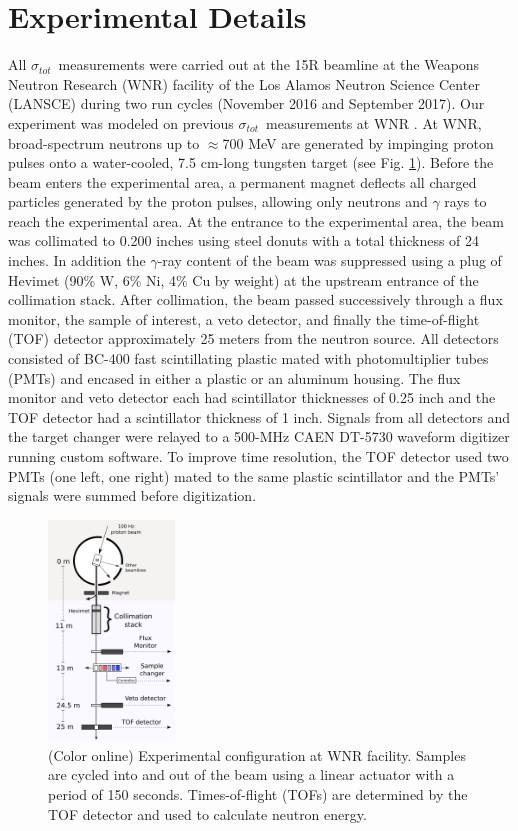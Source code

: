 \documentclass[twocolumn,secnumarabic,amssymb, nobibnotes, aps, prl,
superscriptaddress, nobalancelastpage]{revtex4}
\newcommand{\tot}{\ensuremath{\sigma_{tot}}}
\begin{document}
\section{Experimental Details}
All \tot\ measurements were carried out at the 15R
beamline at the Weapons Neutron Research (WNR) facility of the Los Alamos
Neutron Science Center (LANSCE) during two run cycles (November 2016 and
September 2017). Our experiment was modeled on previous
\tot\ measurements at WNR \cite{Finlay1993,Abfalterer2001,Shane2010}.
At WNR,
broad-spectrum neutrons up
to $\approx$700 MeV are generated by impinging proton pulses onto a water-cooled, 7.5
cm-long tungsten target (see Fig. \ref{ExperimentalApparatus}). Before the beam
enters the experimental area, a
permanent magnet deflects all charged particles generated by the proton pulses, 
allowing only neutrons and $\gamma$ rays to reach the experimental area. At the
entrance to the experimental area, the beam was collimated to 0.200 inches using steel
donuts with a total thickness of 24 inches. In addition the $\gamma$-ray content of the beam
was suppressed using a plug of Hevimet (90\% W, 6\% Ni, 4\% Cu by weight)
at the upstream entrance of the collimation stack.
After collimation, the beam passed successively through a flux 
monitor, the sample of interest, a veto detector, and finally the 
time-of-flight (TOF) detector approximately 25 meters from the neutron source.
All detectors consisted of BC-400 fast scintillating plastic mated with 
photomultiplier tubes (PMTs) and encased in either a plastic or
an aluminum housing. The flux monitor and veto detector each had
scintillator thicknesses of 0.25 inch and the TOF detector had a
scintillator thickness of 1 inch. Signals from all detectors and
the target changer were relayed to a 500-MHz CAEN DT-5730 waveform digitizer
running custom software. To improve time resolution, the TOF detector used two
PMTs (one left, one right) mated to the same plastic scintillator and the PMTs' signals were 
summed before digitization.

\begin{figure}
    \includegraphics[width=0.3\textwidth]{figures/ExperimentalSetup.png}
    \caption{(Color online) Experimental configuration at WNR facility.
        Samples are cycled into and out of the beam
        using a linear actuator with a period of 150 seconds. Times-of-flight (TOFs) are
    determined by the TOF detector and used to calculate neutron energy.}
    \label{ExperimentalApparatus}
\end{figure}
\end{document}
